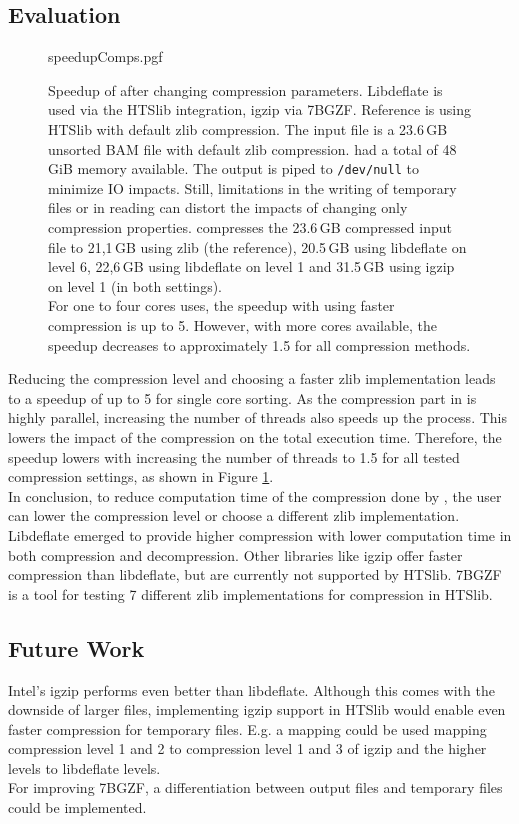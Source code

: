 \subsection{Evaluation}
\begin{figure}[t]
        {speedupComps.pgf}
    \caption{Speedup of \sort after changing compression parameters. Libdeflate is used via the HTSlib integration, igzip via 7BGZF. Reference is \sort using HTSlib with default zlib compression. The input file is a 23.6\,GB unsorted BAM file with default zlib compression. \sort had a total of 48\,GiB memory available. The output is piped to \texttt{/dev/null} to minimize IO impacts. Still, limitations in the writing of temporary files or in reading can distort the impacts of changing only compression properties. \sort compresses the 23.6\,GB compressed input file to 21,1\,GB using zlib (the reference), 20.5\,GB using libdeflate on level 6, 22,6\,GB using libdeflate on level 1 and 31.5\,GB using igzip on level 1 (in both settings). \\
    For one to four cores \sort uses, the speedup with using faster compression is up to 5. However, with more cores available, the speedup decreases to approximately 1.5 for all compression methods.}
    \label{fig:speedupCompression}
\end{figure}
Reducing the compression level and choosing a faster zlib implementation leads to a speedup of up to 5 for single core sorting. As the compression part in \sort is highly parallel, increasing the number of threads also speeds up the process. This lowers the impact of the compression on the total execution time. Therefore, the speedup lowers with increasing the number of threads to 1.5 for all tested compression settings, as shown in Figure \ref{fig:speedupCompression}. \\
In conclusion, to reduce computation time of the compression done by \sort, the user can lower the compression level or choose a different zlib implementation. Libdeflate emerged to provide higher compression with lower computation time in both compression and decompression. Other libraries like igzip offer faster compression than libdeflate, but are currently not supported by HTSlib. 7BGZF is a tool for testing 7 different zlib implementations for compression in HTSlib.


\subsection{Future Work}
Intel's igzip performs even better than libdeflate. Although this comes with the downside of larger files, implementing igzip support in HTSlib would enable even faster compression for temporary files. E.g. a mapping could be used mapping compression level 1 and 2 to compression level 1 and 3 of igzip and the higher levels to libdeflate levels. \\
For improving 7BGZF, a differentiation between output files and temporary files could be implemented.